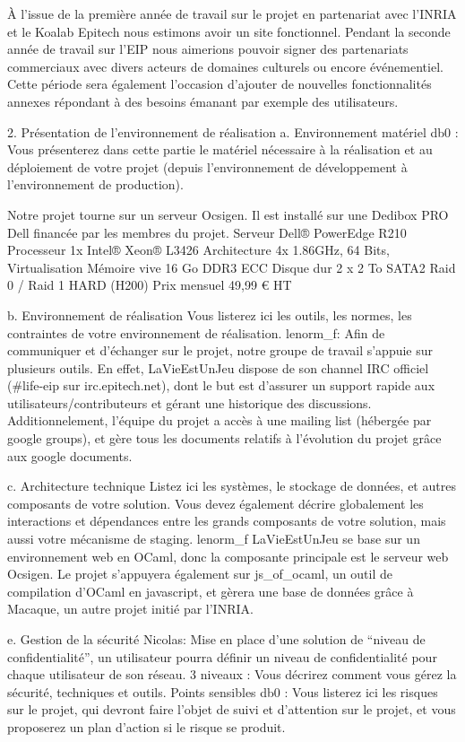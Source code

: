 \documentclass{life-fr}
\begin{document}
À l'issue de la première année de travail sur le projet en partenariat avec l'INRIA et le Koalab Epitech nous estimons avoir un site fonctionnel. Pendant la seconde année de travail sur l'EIP nous aimerions pouvoir signer des partenariats commerciaux avec divers acteurs de domaines culturels ou encore événementiel. Cette période sera également l'occasion d'ajouter de nouvelles fonctionnalités annexes répondant à des besoins émanant par exemple des utilisateurs.

2. Présentation de l’environnement de réalisation
a. Environnement matériel
db0 :
Vous présenterez dans cette partie le matériel nécessaire à la réalisation et au déploiement de
votre projet (depuis l’environnement de développement à
 l’environnement de production).

Notre projet tourne sur un serveur Ocsigen. Il est installé sur une Dedibox PRO Dell financée par les membres du projet.
Serveur
Dell® PowerEdge R210
Processeur
1x Intel® Xeon® L3426
Architecture
4x 1.86GHz, 64 Bits, Virtualisation
Mémoire vive
16 Go DDR3 ECC
Disque dur
2 x 2 To SATA2 Raid 0 / Raid 1 HARD (H200)
Prix mensuel
49,99 € HT


b. Environnement de réalisation
Vous listerez ici les outils, les normes, les contraintes de votre environnement de réalisation.
lenorm_f: Afin de communiquer et d’échanger sur le projet, notre groupe de travail s’appuie sur plusieurs outils. En effet, LaVieEstUnJeu dispose de son channel IRC officiel (#life-eip sur irc.epitech.net), dont le but est d’assurer un support rapide aux utilisateurs/contributeurs et gérant une historique des discussions. Additionnelement, l’équipe du projet a accès à une mailing list (hébergée par google groups), et gère tous les documents relatifs à l’évolution du projet grâce aux google documents.

c. Architecture technique
Listez ici les systèmes, le stockage de données, et autres composants de votre solution. Vous devez également décrire globalement les interactions et dépendances entre les grands composants de votre solution, mais aussi votre mécanisme de staging.
lenorm_f
LaVieEstUnJeu se base sur un environnement web en OCaml, donc la composante principale est le serveur web Ocsigen. Le projet s’appuyera également sur js_of_ocaml, un outil de compilation d’OCaml en javascript, et gèrera une base de données grâce à Macaque, un autre projet initié par l’INRIA.

e. Gestion de la sécurité
Nicolas:
Mise en place d’une solution de “niveau de confidentialité”, un utilisateur pourra définir un niveau de confidentialité pour chaque utilisateur de son réseau. 
3 niveaux :
Vous décrirez comment vous gérez la sécurité, techniques et outils.
Points sensibles
db0 : 
Vous listerez ici les risques sur le projet, qui devront faire l’objet de suivi et d’attention sur le
projet, et vous proposerez un plan d’action si le risque se produit.
\end{document}
